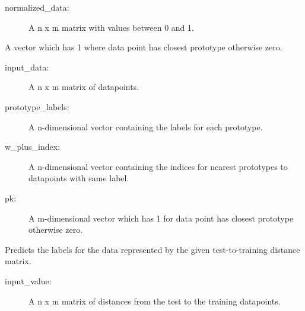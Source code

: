 \documentclass[letterpaper,10pt,english]{sphinxmanual}
\begin{document}
\begin{fulllineitems}
\begin{fulllineitems}
\begin{description}
\end{description}
\begin{description}
\item[{normalized\_data:}] \leavevmode
A n x m matrix with values between 0 and 1.

\end{description}

\end{fulllineitems}


\begin{fulllineitems}
\label{\detokenize{index:lmlvq_distance.LMLVQ.one_p_k}}
A vector which has 1 where data point has closest prototype otherwise
zero.
\begin{description}
\item[{input\_data:}] \leavevmode
A n x m matrix of datapoints.

\item[{prototype\_labels:}] \leavevmode
A n-dimensional vector containing the labels for each
prototype.

\item[{w\_plus\_index:}] \leavevmode
A n-dimensional vector containing the indices for nearest
prototypes to datapoints with same label.

\end{description}
\begin{description}
\item[{pk:}] \leavevmode
A m-dimensional vector which has 1 for data point has
closest prototype otherwise zero.

\end{description}

\end{fulllineitems}


\begin{fulllineitems}
\label{\detokenize{index:lmlvq_distance.LMLVQ.predict}}
Predicts the labels for the data represented by the
given test-to-training distance matrix.
\begin{description}
\item[{input\_value:}] \leavevmode
A n x m matrix of distances from the test to the training
datapoints.


\end{description}
\end{fulllineitems}
\end{fulllineitems}
\end{document}
